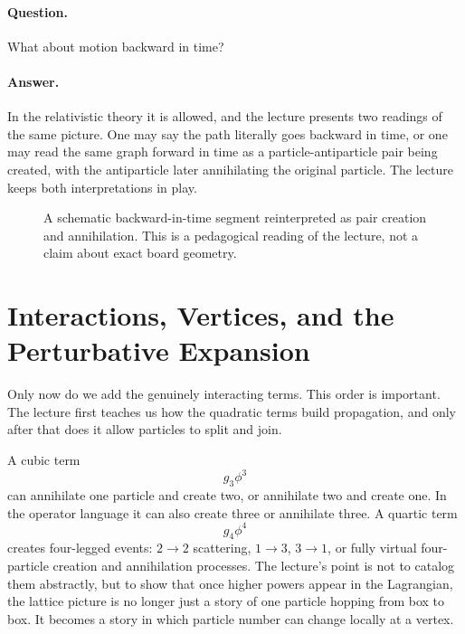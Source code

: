 \paragraph{Question.} What about motion backward in time?

\paragraph{Answer.} In the relativistic theory it is allowed, and the lecture presents two readings of the same picture. One may say the path literally goes backward in time, or one may read the same graph forward in time as a particle-antiparticle pair being created, with the antiparticle later annihilating the original particle. The lecture keeps both interpretations in play.

\begin{figure}[h]
\centering
{}
\caption{A schematic backward-in-time segment reinterpreted as pair creation and annihilation. This is a pedagogical reading of the lecture, not a claim about exact board geometry.}
\end{figure}

\section{Interactions, Vertices, and the Perturbative Expansion}

Only now do we add the genuinely interacting terms. This order is important. The lecture first teaches us how the quadratic terms build propagation, and only after that does it allow particles to split and join.

A cubic term
\begin{equation}
g_3\phi^3
\end{equation}
can annihilate one particle and create two, or annihilate two and create one. In the operator language it can also create three or annihilate three. A quartic term
\begin{equation}
g_4\phi^4
\end{equation}
creates four-legged events: \(2\to2\) scattering, \(1\to3\), \(3\to1\), or fully virtual four-particle creation and annihilation processes. The lecture's point is not to catalog them abstractly, but to show that once higher powers appear in the Lagrangian, the lattice picture is no longer just a story of one particle hopping from box to box. It becomes a story in which particle number can change locally at a vertex.

